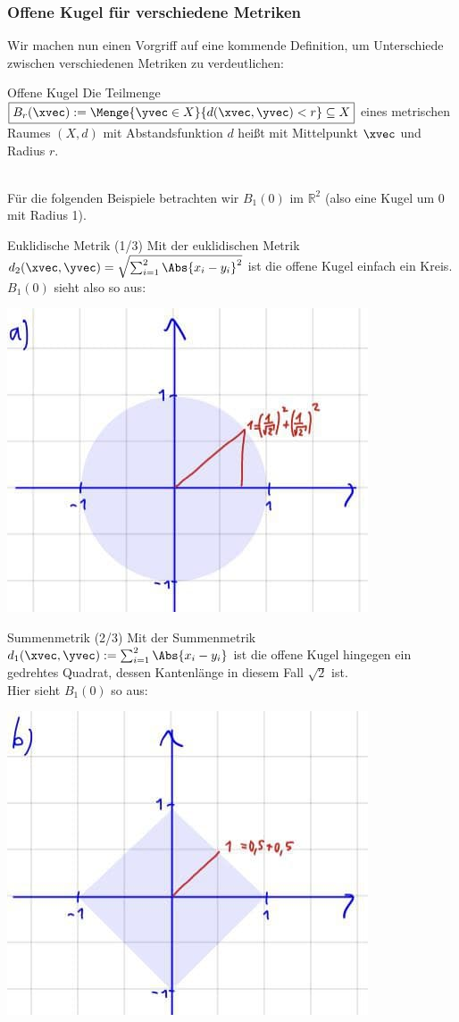 \subsubsection{Offene Kugel für verschiedene Metriken}
Wir machen nun einen Vorgriff auf eine kommende Definition, um Unterschiede zwischen verschiedenen Metriken zu verdeutlichen:
\begin{Def}
{Offene Kugel}
Die Teilmenge $\boxed{B_r(\xvec):=\Menge{\yvec\in X}{d(\xvec,\yvec)<r}\subseteq X}$ eines metrischen Raumes $(X,d)$ mit Abstandsfunktion $d$ heißt  mit Mittelpunkt $\xvec$ und Radius $r$.
\end{Def}
\\
Für die folgenden Beispiele betrachten wir $B_1(0)$ im $\mathbb{R}^2$ (also eine Kugel um 0 mit Radius 1).
\begin{Beispiel}{Euklidische Metrik (1/3)}
Mit der euklidischen Metrik $d_2(\xvec,\yvec)=\sqrt{\sum_{i=1}^2\Abs{x_i-y_i}^2}$ ist die offene Kugel einfach ein Kreis.\\ $B_1(0)$ sieht also so aus:
\begin{center}
    \includegraphics[width=.35\textwidth]{Dateien/05/05Metrik1.jpg}
\end{center}
\end{Beispiel}
\begin{Beispiel}
{Summenmetrik (2/3)}
Mit der Summenmetrik $d_1(\xvec,\yvec):=\sum_{i=1}^2\Abs{x_i-y_i}$ ist die offene Kugel hingegen ein gedrehtes Quadrat, dessen Kantenlänge in diesem Fall $\sqrt{2}$ ist.\\ Hier sieht $B_1(0)$ so aus:
\begin{center}
    \includegraphics[width=.35\textwidth]{Dateien/05/05Metrik2.jpg}
\end{center}
\end{Beispiel}
